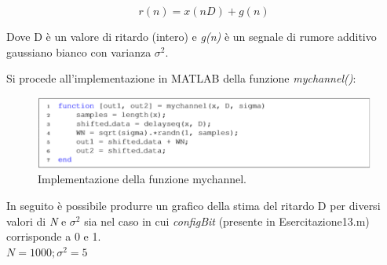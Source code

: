 \begin{equation}
	r(n)=x(nD) + g(n)
\end{equation}

Dove D è un valore di ritardo (intero) e \textit{g(n)} è un segnale di rumore additivo gaussiano bianco con varianza $\sigma^2$.
\par
Si procede all'implementazione in MATLAB della funzione \textit{mychannel()}:

\begin{figure}[H]
\centering
\includegraphics[width=\textwidth]{./images/cap2/mychannel_impl.png}
\caption{Implementazione della funzione mychannel. }
\end{figure}

In seguito è possibile produrre un graﬁco della stima del ritardo D per diversi valori di \textit{N} e $\sigma^2$ sia nel caso in cui \textit{conﬁgBit} (presente in Esercitazione13.m) corrisponde a 0 e 1.
\\

$N = 1000;  \sigma^2= 5$

